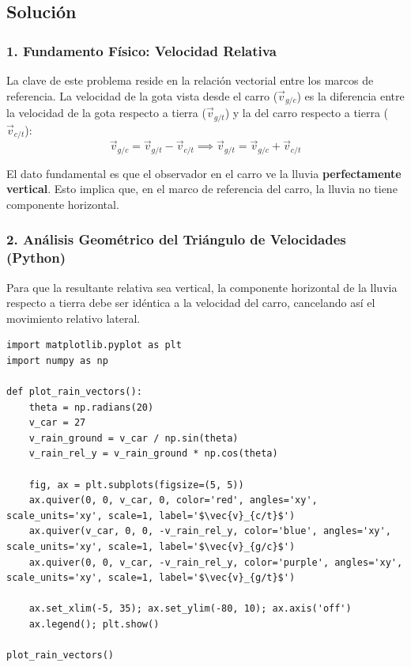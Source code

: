 \documentclass[12pt, a4paper]{article}
\begin{document}
\subsection*{Solución}

\subsubsection*{1. Fundamento Físico: Velocidad Relativa}

La clave de este problema reside en la relación vectorial entre los marcos de referencia. La velocidad de la gota vista desde el carro ($\vec{v}_{g/c}$) es la diferencia entre la velocidad de la gota respecto a tierra ($\vec{v}_{g/t}$) y la del carro respecto a tierra ($\vec{v}_{c/t}$):
\begin{equation}
    \vec{v}_{g/c} = \vec{v}_{g/t} - \vec{v}_{c/t} \implies \vec{v}_{g/t} = \vec{v}_{g/c} + \vec{v}_{c/t}
\end{equation}

El dato fundamental es que el observador en el carro ve la lluvia \textbf{perfectamente vertical}. Esto implica que, en el marco de referencia del carro, la lluvia no tiene componente horizontal.

\subsubsection*{2. Análisis Geométrico del Triángulo de Velocidades (Python)}

Para que la resultante relativa sea vertical, la componente horizontal de la lluvia respecto a tierra debe ser idéntica a la velocidad del carro, cancelando así el movimiento relativo lateral.



\begin{lstlisting}
import matplotlib.pyplot as plt
import numpy as np

def plot_rain_vectors():
    theta = np.radians(20)
    v_car = 27
    v_rain_ground = v_car / np.sin(theta)
    v_rain_rel_y = v_rain_ground * np.cos(theta)

    fig, ax = plt.subplots(figsize=(5, 5))
    ax.quiver(0, 0, v_car, 0, color='red', angles='xy', scale_units='xy', scale=1, label='$\vec{v}_{c/t}$')
    ax.quiver(v_car, 0, 0, -v_rain_rel_y, color='blue', angles='xy', scale_units='xy', scale=1, label='$\vec{v}_{g/c}$')
    ax.quiver(0, 0, v_car, -v_rain_rel_y, color='purple', angles='xy', scale_units='xy', scale=1, label='$\vec{v}_{g/t}$')

    ax.set_xlim(-5, 35); ax.set_ylim(-80, 10); ax.axis('off')
    ax.legend(); plt.show()

plot_rain_vectors()
\end{lstlisting}
\end{document}
